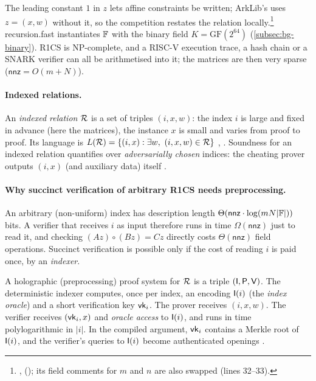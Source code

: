 The leading constant $1$ in $z$ lets affine constraints be written; ArkLib's
 uses $z=(x,w)$ without it, so the competition restates the relation
locally.\footnote{, 
(); its field comments for $m$ and $n$ are also swapped (lines 32--33).}
recursion.fast instantiates $\mathbb{F}$ with the binary field $K=\mathrm{GF}(2^{64})$
(\cref{subsec:bg-binary}). R1CS is NP-complete, and a RISC-V execution trace, a hash chain or a SNARK verifier can all be
arithmetised into it; the matrices are then very sparse ($\mathsf{nnz}=O(m+N)$).

\paragraph{Indexed relations.} An \emph{indexed relation} $\mathcal{R}$ is a set of triples $(i,x,w)$:
the index $i$ is large and fixed in advance (here the matrices), the instance $x$ is small and
varies from proof to proof. Its language is $L(\mathcal{R})=\{(i,x) : \exists w,\ (i,x,w)\in\mathcal{R}\}$
\cite{CHMMVW20-Marlin,COS20}, \cite[ch.~32]{CY24-Book}. Soundness for an indexed relation
quantifies over \emph{adversarially chosen} indices: the cheating prover outputs $(i,x)$ (and
auxiliary data) itself \cite[Def.~32.4.2]{CY24-Book}.

\paragraph{Why succinct verification of arbitrary R1CS needs preprocessing.} An arbitrary
(non-uniform) index has description length $\Theta(\mathsf{nnz}\cdot\log(mN|\mathbb{F}|))$ bits. A
verifier that receives $i$ as input therefore runs in time $\Omega(\mathsf{nnz})$ just to read it,
and checking $(Az)\circ(Bz)=Cz$ directly costs $\Theta(\mathsf{nnz})$ field operations. Succinct
verification is possible only if the cost of reading $i$ is paid once, by an \emph{indexer}.

\begin{definition}\label{def:bg-holographic}
A holographic (preprocessing) proof system for $\mathcal{R}$ is a triple $(\mathsf{I},\mathsf{P},\mathsf{V})$. The
deterministic indexer computes, once per index, an encoding $\mathsf{I}(i)$ (the \emph{index oracle})
and a short verification key $\mathsf{vk}_i$. The prover receives $(i,x,w)$. The verifier receives
$(\mathsf{vk}_i,x)$ and \emph{oracle access} to $\mathsf{I}(i)$, and runs in time polylogarithmic in
$|i|$. In the compiled argument, $\mathsf{vk}_i$ contains a Merkle root of $\mathsf{I}(i)$, and the verifier's
queries to $\mathsf{I}(i)$ become authenticated openings \cite[ch.~32]{CY24-Book}.
\end{definition}

